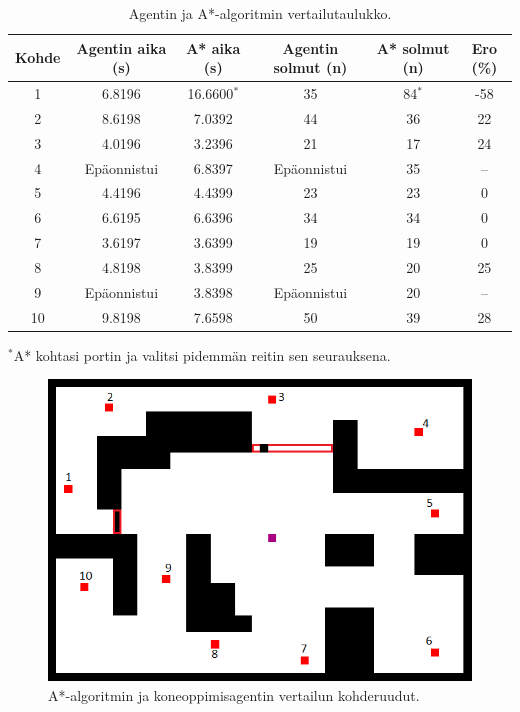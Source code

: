 \documentclass[utf8]{gradu3}
\begin{document}
\begin{table}[htp]
\centering
\caption{Agentin ja A*-algoritmin vertailutaulukko.}
\label{vertailutaulukko}
\begin{tabular}{cccccc}
\hline
Kohde & Agentin aika (s) & A* aika (s) & Agentin solmut (n) & A* solmut (n) & Ero (\%) \\
\hline \hline
1 & 6.8196 & 16.6600$^*$ & 35 & 84$^*$ & -58 \\

2 & 8.6198 & 7.0392 & 44 & 36 & 22 \\

3 & 4.0196 & 3.2396 & 21 & 17 & 24 \\

4 & Epäonnistui & 6.8397 & Epäonnistui & 35 & -- \\

5 & 4.4196 & 4.4399 & 23 & 23 & 0 \\

6 & 6.6195 & 6.6396 & 34 & 34 & 0 \\

7 & 3.6197 & 3.6399 & 19 & 19 & 0 \\

8 & 4.8198 & 3.8399 & 25 & 20 & 25 \\

9 & Epäonnistui & 3.8398 & Epäonnistui & 20 & -- \\

10 & 9.8198 & 7.6598 & 50 & 39 & 28 \\

\hline

\end{tabular}

$^*$A* kohtasi portin ja valitsi pidemmän reitin sen seurauksena.

\end{table}

\begin{figure}[h]
\centering
\includegraphics[width=12cm]{area_difficult_test_targets.png}
\caption{A*-algoritmin ja koneoppimisagentin vertailun kohderuudut.}
\label{testtargets}
\end{figure}
\end{document}
